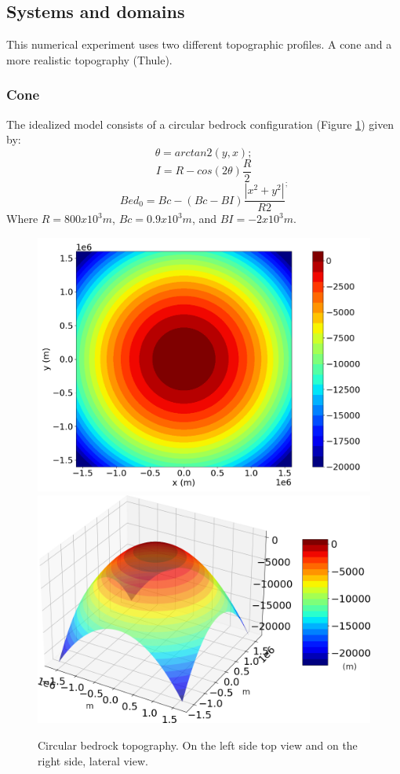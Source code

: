 \documentclass{article}
\begin{document}
\subsection{Systems and domains}
This numerical experiment uses two different topographic profiles. A cone and a more realistic topography (Thule).
\subsubsection{Cone}
The idealized model consists of a circular bedrock configuration (Figure \ref{circular_topo_top}) given by:
\begin{equation}
	\theta=arctan2(y,x);
\end{equation}
\begin{equation}
	I=R-cos(2\theta)\frac{R}{2}
\end{equation}
\begin{equation}
	Bed_0=Bc-(Bc-BI)\frac{|x^2+y^2|}{R2}^;
\end{equation}
Where $R=800x10^3 m$, $Bc=0.9 x 10^3 m$, and $BI=-2 x 10^3 m$. 
\begin{figure}[!h]
	\centering
	\includegraphics[width=0.45\linewidth]{../fig/circular_topo_top.png}
	\includegraphics[width=0.45\linewidth]{../fig/circular_topo_jet}
	\caption{Circular bedrock topography. On the left side top view and on the right side, lateral view.}
	\label{circular_topo_top}
\end{figure}
\end{document}
